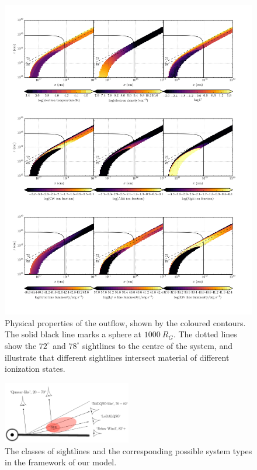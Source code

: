 \documentclass[preprint, a4paper, 11pt]{aastex}
\begin{document}
\begin{figure} %
\centering
\includegraphics[width=1.0\textwidth]{figures/wind.png}
\caption
{
Physical properties of the outflow, shown by the coloured contours.
The solid black line marks a sphere at $1000~R_G$.
The dotted lines show the $72^\circ$ and $78^\circ$ sightlines 
to the centre of the system, and illustrate that different sightlines
intersect material of different ionization states.
}
\label{fig:uvspec}
\end{figure} %

\begin{figure}
\centering
\includegraphics[width=0.5\textwidth]{figures/sightlines.png}
\caption
{
The classes of sightlines and the corresponding possible 
system types in the framework of our model.
}
\label{fig:lobal}
\end{figure}
\end{document}
